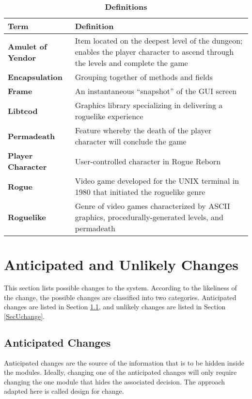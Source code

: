 \documentclass[12pt, titlepage]{article}
\newcommand{\newSection}[1]{
  \newpage
  \section{#1}
}
\begin{document}
        \begin{table}[H]
            \centering
            \caption{\bf Definitions}
            \label{TableDefinitions}
            \bigskip
            \def\arraystretch{1.5}
            \begin{tabularx}{\textwidth}{p{3.7cm}X}
                \toprule
                \textbf{Term} & \textbf{Definition}\\
                \midrule
                \textbf{Amulet of Yendor} & Item located on the deepest level of the dungeon; enables the player character to ascend through the levels and complete the game\\
                \textbf{Encapsulation} & Grouping together of methods and fields\\
                \textbf{Frame} & An instantaneous ``snapshot'' of the GUI screen\\
                \textbf{Libtcod} & Graphics library specializing in delivering a roguelike experience\\
                \textbf{Permadeath} & Feature whereby the death of the player character will conclude the game\\
                \textbf{Player Character} & User-controlled character in Rogue Reborn\\
                \textbf{Rogue} & Video game developed for the UNIX terminal in 1980 that initiated the roguelike genre\\
                \textbf{Roguelike} & Genre of video games characterized by ASCII graphics, procedurally-generated levels, and permadeath\\
                \bottomrule
            \end{tabularx}
        \end{table} 

\newSection{Anticipated and Unlikely Changes} \label{SecChange}

    This section lists possible changes to the system. According to the likeliness of the change, the possible changes are classified into two  categories. Anticipated changes are listed in Section \ref{SecAchange}, and unlikely changes are listed in Section \ref{SecUchange}.

    \subsection{Anticipated Changes} \label{SecAchange}

        Anticipated changes are the source of the information that is to be hidden inside the modules. Ideally, changing one of the anticipated changes will only require changing the one module that hides the associated decision. The approach adapted here is called design for change.
\end{document}
